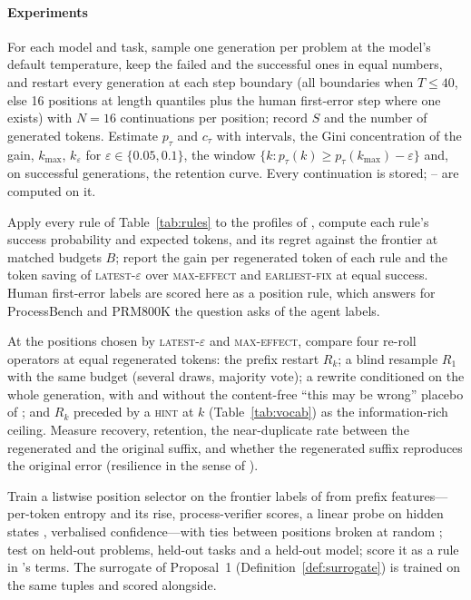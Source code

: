 \paragraph{Experiments}
\begin{description}[leftmargin=1.4em,style=nextline,itemsep=1pt]
\item[\EXP{5.1} --- The restart profile (answers \RQ{5.1}, \RQ{5.3}).] For each model and task, sample one generation per problem at the model's default temperature, keep the failed and the successful ones in equal numbers, and restart every generation at each step boundary (all boundaries when $T\le40$, else 16 positions at length quantiles plus the human first-error step where one exists) with $N=16$ continuations per position; record $S$ and the number of generated tokens. Estimate $p_\tau$ and $c_\tau$ with intervals, the Gini concentration of the gain, $k_{\max}$, $k_\varepsilon$ for $\varepsilon\in\{0.05,0.1\}$, the window $\{k:p_\tau(k)\ge p_\tau(k_{\max})-\varepsilon\}$ and, on successful generations, the retention curve. Every continuation is stored; -- are computed on it.
\item[\EXP{5.2} --- Rules against the frontier (answers \RQ{5.2}).] Apply every rule of Table~\ref{tab:rules} to the profiles of , compute each rule's success probability and expected tokens, and its regret against the frontier at matched budgets $B$; report the gain per regenerated token of each rule and the token saving of \textsc{latest-}$\varepsilon$ over \textsc{max-effect} and \textsc{earliest-fix} at equal success. Human first-error labels are scored here as a position rule, which answers for ProcessBench and PRM800K the question  asks of the agent labels.
\item[\EXP{5.3} --- Operators at matched tokens (answers \RQ{5.4}).] At the positions chosen by \textsc{latest-}$\varepsilon$ and \textsc{max-effect}, compare four re-roll operators at equal regenerated tokens: the prefix restart $R_k$; a blind resample $R_1$ with the same budget (several draws, majority vote); a rewrite conditioned on the whole generation, with and without the content-free ``this may be wrong'' placebo of \citet{verma2026tryagain}; and $R_k$ preceded by a \textsc{hint} at $k$ (Table~\ref{tab:vocab}) as the information-rich ceiling. Measure recovery, retention, the near-duplicate rate between the regenerated and the original suffix, and whether the regenerated suffix reproduces the original error (resilience in the sense of \citet{macar2025thoughtbranches}).
\item[\EXP{5.4} --- Predicting the position (answers \RQ{5.5}).] Train a listwise position selector on the frontier labels of  from prefix features---per-token entropy and its rise, process-verifier scores, a linear probe on hidden states \cite{yuan2026hiddenerror}, verbalised confidence---with ties between positions broken at random \cite{atri2026expanding}; test on held-out problems, held-out tasks and a held-out model; score it as a rule in 's terms. The surrogate of Proposal~1 (Definition~\ref{def:surrogate}) is trained on the same tuples and scored alongside.

\end{description}
